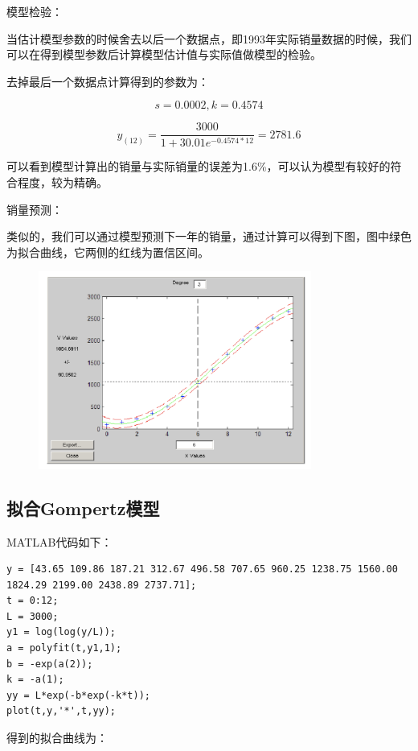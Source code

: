 \documentclass{article}
\begin{document}
模型检验：

当估计模型参数的时候舍去以后一个数据点，即1993年实际销量数据的时候，我们可以在得到模型参数后计算模型估计值与实际值做模型的检验。

去掉最后一个数据点计算得到的参数为：

$$s = 0.0002, k=0.4574$$

$$y_{(12)}=\frac{3000}{1+30.01e^{-0.4574*12}}=2781.6$$

可以看到模型计算出的销量与实际销量的误差为1.6\%，可以认为模型有较好的符合程度，较为精确。


销量预测：

类似的，我们可以通过模型预测下一年的销量，通过计算可以得到下图，图中绿色为拟合曲线，它两侧的红线为置信区间。

\begin{figure}[H]
    \centering
    \includegraphics[width=0.8\textwidth]{pic26.png}
\end{figure}

\subsection{拟合Gompertz模型}

MATLAB代码如下：

\begin{lstlisting}
y = [43.65 109.86 187.21 312.67 496.58 707.65 960.25 1238.75 1560.00 1824.29 2199.00 2438.89 2737.71];
t = 0:12;
L = 3000;
y1 = log(log(y/L));
a = polyfit(t,y1,1);
b = -exp(a(2));
k = -a(1);
yy = L*exp(-b*exp(-k*t));
plot(t,y,'*',t,yy);

\end{lstlisting}

得到的拟合曲线为：
\end{document}
